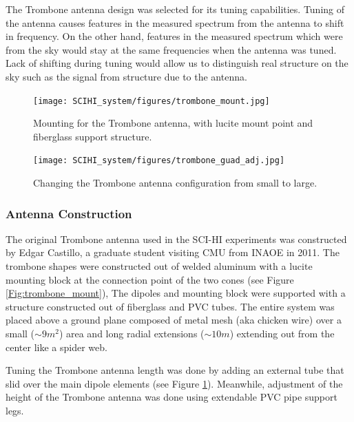 The Trombone antenna design was selected for its tuning capabilities. Tuning of the antenna causes features in the measured spectrum from the antenna to shift in frequency. On the other hand, features in the measured spectrum which were from the sky would stay at the same frequencies when the antenna was tuned. Lack of shifting during tuning would allow us to distinguish real structure on the sky such as the \cm signal from structure due to the antenna. 

\begin{figure}[htb]
\centering
\begin{minipage}[b]{0.53\textwidth}
\centering
\texttt{[image: SCIHI\_system/figures/trombone\_mount.jpg]}
\caption{Mounting for the Trombone antenna, with lucite mount point and fiberglass support structure. }
\label{Fig:trombone_mount}
\end{minipage}%
\begin{minipage}[b]{0.02\textwidth}
\hspace{1cm}
\end{minipage}%
\begin{minipage}[b]{0.41\textwidth}
\centering
\texttt{[image: SCIHI\_system/figures/trombone\_guad\_adj.jpg]}
\caption{Changing the Trombone antenna configuration from small to large.}
\label{Fig:trombone_adj}
\end{minipage}
\end{figure}

\subsubsection{Antenna Construction}

The original Trombone antenna used in the SCI-HI experiments was constructed by Edgar Castillo, a graduate student visiting CMU from INAOE in 2011. The trombone shapes were constructed out of welded aluminum with a lucite mounting block at the connection point of the two cones (see Figure \ref{Fig:trombone_mount}), The dipoles and mounting block were supported with a structure constructed out of fiberglass and PVC tubes. The entire system was placed above a ground plane composed of metal mesh (aka chicken wire) over a small ($\sim9 m^2$) area and long radial extensions ($\sim10 m$) extending out from the center like a spider web. 

Tuning the Trombone antenna length was done by adding an external tube that slid over the main dipole elements (see Figure \ref{Fig:trombone_adj}). Meanwhile, adjustment of the height of the Trombone antenna was done using extendable PVC pipe support legs.

